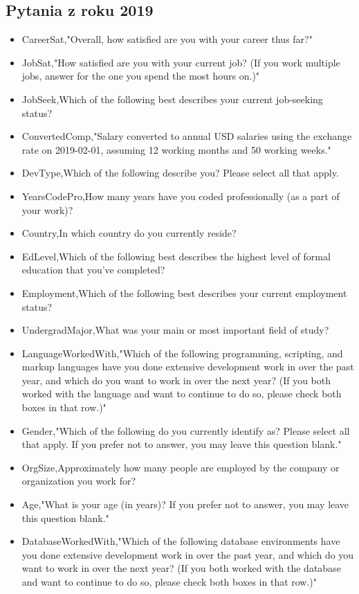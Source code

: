 \begin{appendices}
    \section{Pytania z roku 2019}\label{pytania-2019}
    \begin{itemize}
        \item CareerSat,"Overall, how satisfied are you with your career thus far?"
        \item JobSat,"How satisfied are you with your current job? (If you work multiple jobs, answer for the one you spend the most hours on.)"
        \item JobSeek,Which of the following best describes your current job-seeking status?
        \item ConvertedComp,"Salary converted to annual USD salaries using the exchange rate on 2019-02-01, assuming 12 working months and 50 working weeks."
        \item DevType,Which of the following describe you? Please select all that apply.
        \item YearsCodePro,How many years have you coded professionally (as a part of your work)?
        \item Country,In which country do you currently reside?
        \item EdLevel,Which of the following best describes the highest level of formal education that you’ve completed?
        \item Employment,Which of the following best describes your current employment status?
        \item UndergradMajor,What was your main or most important field of study?
        \item LanguageWorkedWith,"Which of the following programming, scripting, and markup languages have you done extensive development work in over the past year, and which do you want to work in over the next year?  (If you both worked with the language and want to continue to do so, please check both boxes in that row.)"
        \item Gender,"Which of the following do you currently identify as? Please select all that apply. If you prefer not to answer, you may leave this question blank."
        \item OrgSize,Approximately how many people are employed by the company or organization you work for?
        \item Age,"What is your age (in years)? If you prefer not to answer, you may leave this question blank."
        \item DatabaseWorkedWith,"Which of the following database environments have you done extensive development work in over the past year, and which do you want to work in over the next year?   (If you both worked with the database and want to continue to do so, please check both boxes in that row.)"

\end{itemize}
\end{appendices}
